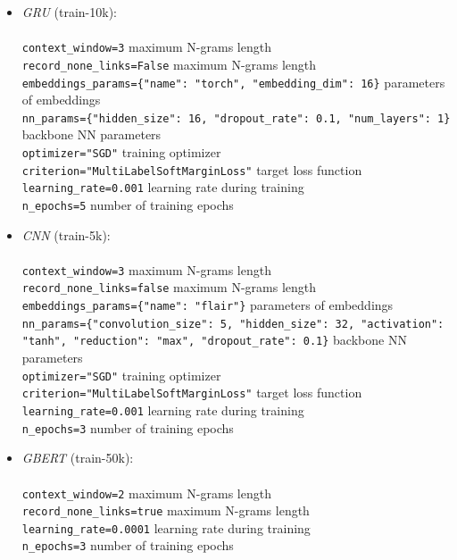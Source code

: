 \documentclass[11pt]{article}
\begin{document}
\begin{itemize}
    \item \textit{GRU} (train-10k): \\ \\
    \texttt{context\_window=3} \quad maximum N-grams length \\
    \texttt{record\_none\_links=False} \quad maximum N-grams length \\
    \texttt{embeddings\_params=\{"name": "torch", "embedding\_dim": 16\}} \quad parameters of embeddings \\
    \texttt{nn\_params=\{"hidden\_size": 16, "dropout\_rate": 0.1, "num\_layers": 1\}} \quad backbone NN parameters \\
    \texttt{optimizer="SGD"} \quad training optimizer \\
    \texttt{criterion="MultiLabelSoftMarginLoss"} \quad target loss function \\
    \texttt{learning\_rate=0.001} \quad learning rate during training \\
    \texttt{n\_epochs=5} \quad number of training epochs \\

    \item \textit{CNN} (train-5k): \\ \\
    \texttt{context\_window=3} \quad maximum N-grams length \\
    \texttt{record\_none\_links=false} \quad maximum N-grams length \\
    \texttt{embeddings\_params=\{"name": "flair"\}} \quad parameters of embeddings \\
    \texttt{nn\_params=\{"convolution\_size": 5, "hidden\_size": 32, "activation": "tanh", "reduction": "max", "dropout\_rate": 0.1\}} \quad backbone NN parameters \\
    \texttt{optimizer="SGD"} \quad training optimizer \\
    \texttt{criterion="MultiLabelSoftMarginLoss"} \quad target loss function \\
    \texttt{learning\_rate=0.001} \quad learning rate during training \\
    \texttt{n\_epochs=3} \quad number of training epochs \\

    \item \textit{GBERT} (train-50k): \\ \\
    \texttt{context\_window=2} \quad maximum N-grams length \\
    \texttt{record\_none\_links=true} \quad maximum N-grams length \\
    \texttt{learning\_rate=0.0001} \quad learning rate during training \\
    \texttt{n\_epochs=3} \quad number of training epochs \\


\end{itemize}
\end{document}
